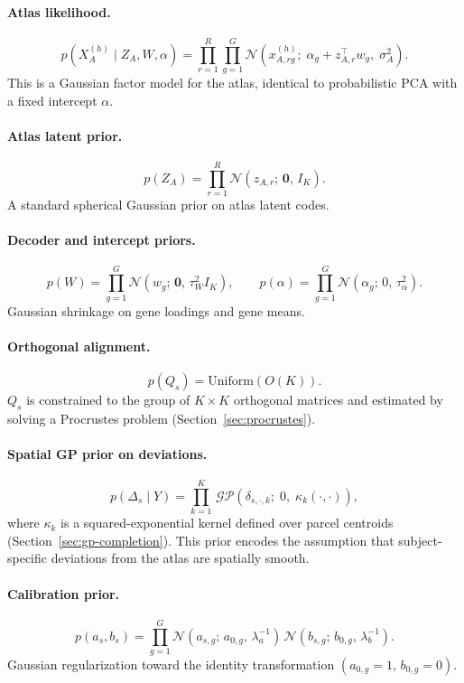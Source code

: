 \documentclass[11pt]{article}
\numberwithin{equation}{section}
\begin{document}
\paragraph{Atlas likelihood.}
\[
  p(X_A^{(h)}\mid Z_A,W,\alpha)
  = \prod_{r=1}^R\prod_{g=1}^G
    \mathcal{N}\!\left(x_{A,rg}^{(h)};\;\alpha_g + z_{A,r}^\top w_g,\;\sigma_A^2\right).
\]
This is a Gaussian factor model for the atlas, identical to probabilistic PCA
\cite{tipping1999ppca} with a fixed intercept $\alpha$.

\paragraph{Atlas latent prior.}
\[
  p(Z_A) = \prod_{r=1}^R \mathcal{N}(z_{A,r};\,\mathbf{0},\,I_K).
\]
A standard spherical Gaussian prior on atlas latent codes.

\paragraph{Decoder and intercept priors.}
\[
  p(W) = \prod_{g=1}^G \mathcal{N}(w_g;\,\mathbf{0},\,\tau_W^2 I_K),
  \qquad
  p(\alpha) = \prod_{g=1}^G \mathcal{N}(\alpha_g;\,0,\,\tau_\alpha^2).
\]
Gaussian shrinkage on gene loadings and gene means.

\paragraph{Orthogonal alignment.}
\[
  p(Q_s) = \mathrm{Uniform}\!\left(O(K)\right).
\]
$Q_s$ is constrained to the group of $K\times K$ orthogonal matrices and estimated by
solving a Procrustes problem (Section~\ref{sec:procrustes}).

\paragraph{Spatial GP prior on deviations.}
\[
  p(\Delta_s \mid Y) = \prod_{k=1}^K\,
  \mathcal{GP}\!\left(\delta_{s,\cdot,k};\;0,\;\kappa_k(\cdot,\cdot)\right),
\]
where $\kappa_k$ is a squared-exponential kernel defined over parcel centroids
(Section~\ref{sec:gp-completion}).  This prior encodes the assumption that
subject-specific deviations from the atlas are spatially smooth.

\paragraph{Calibration prior.}
\[
  p(a_s,b_s)
  = \prod_{g=1}^G
    \mathcal{N}(a_{s,g};\,a_{0,g},\,\lambda_a^{-1})\,
    \mathcal{N}(b_{s,g};\,b_{0,g},\,\lambda_b^{-1}).
\]
Gaussian regularization toward the identity transformation $(a_{0,g}=1,\,b_{0,g}=0)$.
\end{document}
